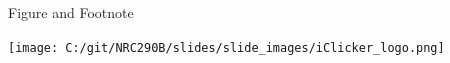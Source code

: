 \documentclass[
  ignorenonframetext,
]{beamer}
\begin{document}
\begin{frame}{Figure and Footnote}
\protect\hypertarget{figure-and-footnote}{}

\begin{center}
\texttt{[image: C:/git/NRC290B/slides/slide\_images/iClicker\_logo.png]}
\end{center}


\end{frame}
\end{document}

